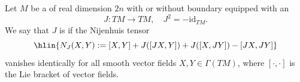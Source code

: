 
\begin{definition} \label{definition:integrable_almost_complex_structure_on_a_smooth_manifold_of_even_real_dimension}
    Let $M$ be a  of real dimension $2n$ with or without boundary equipped with an 
    $$
    J : TM \to TM, \quad J^2 = - \mathrm{id}_{TM}.
    $$
    We say that $J$ is  if the Nijenhuis tensor
    $$ \hlin{N_J (X, Y) := [X, Y] + J([JX, Y]) + J([X, JY]) - [JX, JY]}$$
    vanishes identically for all smooth vector fields $X, Y \in \Gamma(TM)$,
    where $[ \cdot , \cdot ]$ is the Lie bracket of vector fields.
\end{definition}